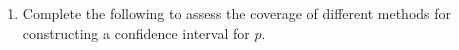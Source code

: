 \documentclass{article}\usepackage[]{graphicx}\usepackage[]{xcolor}
\begin{document}
\begin{enumerate}
\begin{enumerate}
    the population distribution. Suppose that the true underlying population 
    distribution is 
    \[X_i \sim \textrm{Gaussian}(\mu_X=\lambda, \sigma_X=\lambda),\]
    and therefore
    \[\bar{X} \sim \textrm{Gaussian}(\mu_{\bar{X}}=\lambda, \sigma_{\bar{X}}=\lambda/\sqrt{n}).\]
  \end{enumerate}
  \newpage
  \item Complete the following to assess the coverage of 
  different methods for constructing a confidence interval for $p$. 
  

\end{enumerate}
\end{document}
